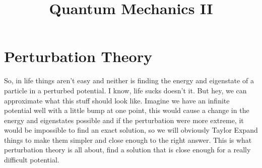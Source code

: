 \documentclass[garamond]{article}
\title{Quantum Mechanics II}
\author{}
\begin{document}
\maketitle

\section{Perturbation Theory}
So, in life things aren't easy and neither is finding the energy and eigenstate of a particle in a perturbed potential. I know, life sucks doesn't it. But hey, we can approximate what this stuff should look like. Imagine we have an infinite potential well with a little bump at one point, this would cause a change in the energy and eigenstates possible and if the perturbation were more extreme, it would be impossible to find an exact solution, so we will obviously Taylor Expand things to make them simpler and close enough to the right answer. This is what perturbation theory is all about, find a solution that is close enough for a really difficult potential.
\end{document}
